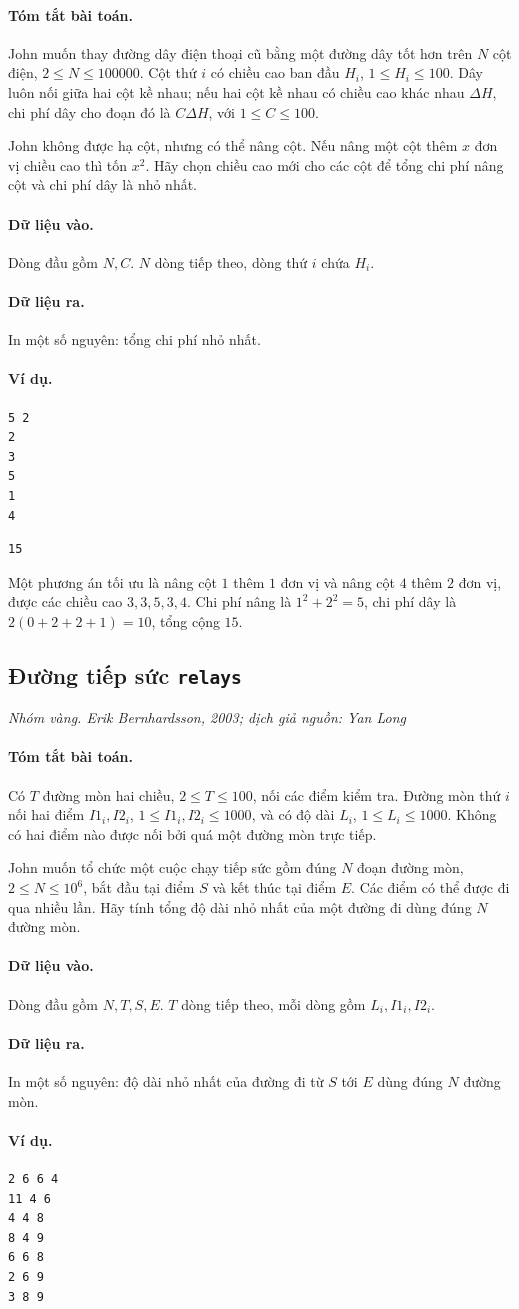 \documentclass[11pt]{article}
\newcommand{\problem}[4]{%
  \subsection[#1 (#2)]{#1 \hfill {\normalsize\texttt{#2}}}%
  \noindent\textit{#3. #4}\par\smallskip
}
\newcommand{\iosec}[1]{\paragraph{#1}}
\begin{document}
\iosec{Tóm tắt bài toán.}
John muốn thay đường dây điện thoại cũ bằng một đường dây tốt hơn trên
\(N\) cột điện, \(2\le N\le 100000\). Cột thứ \(i\) có chiều cao ban đầu
\(H_i\), \(1\le H_i\le 100\). Dây luôn nối giữa hai cột kề nhau; nếu hai cột
kề nhau có chiều cao khác nhau \(\Delta H\), chi phí dây cho đoạn đó là
\(C\Delta H\), với \(1\le C\le 100\).

John không được hạ cột, nhưng có thể nâng cột. Nếu nâng một cột thêm \(x\)
đơn vị chiều cao thì tốn \(x^2\). Hãy chọn chiều cao mới cho các cột để tổng
chi phí nâng cột và chi phí dây là nhỏ nhất.

\iosec{Dữ liệu vào.}
Dòng đầu gồm \(N,C\). \(N\) dòng tiếp theo, dòng thứ \(i\) chứa \(H_i\).

\iosec{Dữ liệu ra.}
In một số nguyên: tổng chi phí nhỏ nhất.

\iosec{Ví dụ.}
\begin{verbatim}
5 2
2
3
5
1
4
\end{verbatim}

\begin{verbatim}
15
\end{verbatim}

Một phương án tối ưu là nâng cột \(1\) thêm \(1\) đơn vị và nâng cột \(4\)
thêm \(2\) đơn vị, được các chiều cao \(3,3,5,3,4\). Chi phí nâng là
\(1^2+2^2=5\), chi phí dây là \(2(0+2+2+1)=10\), tổng cộng \(15\).

\problem{Đường tiếp sức}{relays}{Nhóm vàng}{Erik Bernhardsson, 2003; dịch giả nguồn: Yan Long}

\iosec{Tóm tắt bài toán.}
Có \(T\) đường mòn hai chiều, \(2\le T\le 100\), nối các điểm kiểm tra. Đường
mòn thứ \(i\) nối hai điểm \(I1_i,I2_i\), \(1\le I1_i,I2_i\le 1000\), và có
độ dài \(L_i\), \(1\le L_i\le 1000\). Không có hai điểm nào được nối bởi
quá một đường mòn trực tiếp.

John muốn tổ chức một cuộc chạy tiếp sức gồm đúng \(N\) đoạn đường mòn,
\(2\le N\le 10^6\), bắt đầu tại điểm \(S\) và kết thúc tại điểm \(E\). Các
điểm có thể được đi qua nhiều lần. Hãy tính tổng độ dài nhỏ nhất của một
đường đi dùng đúng \(N\) đường mòn.

\iosec{Dữ liệu vào.}
Dòng đầu gồm \(N,T,S,E\). \(T\) dòng tiếp theo, mỗi dòng gồm
\(L_i,I1_i,I2_i\).

\iosec{Dữ liệu ra.}
In một số nguyên: độ dài nhỏ nhất của đường đi từ \(S\) tới \(E\) dùng đúng
\(N\) đường mòn.

\iosec{Ví dụ.}
\begin{verbatim}
2 6 6 4
11 4 6
4 4 8
8 4 9
6 6 8
2 6 9
3 8 9
\end{verbatim}
\end{document}
